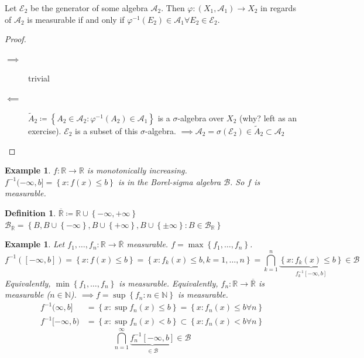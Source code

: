 \documentclass[a4paper]{article}
\newcounter{lecref}[section]
\numberwithin{lecref}{section}
\theoremstyle{break}
\newtheorem{example}[lecref]{Example}
\newtheorem*{Example}{Example}
\newtheorem*{Definition}{Definition}
\newcommand{\Set}[1]{\left\{#1\right\}}
\newcommand{\Max}[1]{\max{\Set{#1}}}
\newcommand{\Min}[1]{\min{\Set{#1}}}
\newcommand{\Sup}[1]{\sup{\Set{#1}}}
\begin{document}
\begin{theorem}
  Let $\mathcal E_2$ be the generator of some algebra $\mathcal A_2$.
  Then $\varphi: (X_1, \mathcal A_1) \to X_2$ in regards of $\mathcal A_2$ is measurable
  if and only if $\varphi^{-1}(E_2) \in \mathcal A_1 \forall E_2 \in \mathcal E_2$.
\end{theorem}
\begin{proof}
  \begin{description}
    \item[$\implies$] trivial
    \item[$\impliedby$]
      $\tilde A_2 \coloneqq \Set{A_2 \in \mathcal A_2: \varphi^{-1}(A_2) \in \mathcal A_1}$
      is a $\sigma$-algebra over $X_2$ (why? left as an exercise).
      $\mathcal E_2$ is a subset of this $\sigma$-algebra.
      $\implies \mathcal A_2 = \sigma(\mathcal E_2) \in \tilde A_2 \subset \mathcal A_2$
  \end{description}
\end{proof}

\begin{Example}
  $f: \mathbb R \to \mathbb R$ is monotonically increasing.
  $f^{-1}(-\infty, b] = \Set{x: f(x) \leq b}$ is in the Borel-sigma algebra $\mathcal B$.
  So $f$ is measurable.
\end{Example}

\begin{Definition}
  $\overline{\mathbb R} \coloneqq \mathbb R \cup \Set{-\infty, +\infty}$ \\
  ${\mathcal B}_{\overline{\mathbb R}} = \Set{B, B \cup \Set{-\infty}, B \cup \Set{+\infty}, B \cup \Set{\pm\infty}: B \in \mathcal B_{\mathbb R}}$
\end{Definition}

\begin{example}
  Let $f_1, \dots, f_n: \mathbb R \to \overline{\mathbb R}$ measurable.
  $f = \Max{f_1, \dots, f_n}$.
  \[ f^{-1}([-\infty, b]) = \Set{x: f(x) \leq b} = \Set{x: f_k(x) \leq b, k = 1, \dots, n} = \bigcap_{k=1}^n \underbrace{\Set{x: f_k(x) \leq b}}_{f_k^{-1}[-\infty, b]} \in \mathcal B \]
  Equivalently, $\Min{f_1, \dots, f_n}$ is measurable.
  Equivalently, $f_n: \mathbb R \to \overline{\mathbb R}$ is measurable ($n \in \mathbb N$).
  $\implies f = \Sup{f_n: n \in \mathbb N}$ is measurable.
  \begin{align*}
    f^{-1}(\infty, b] &= \Set{x: \sup f_n(x) \leq b} = \Set{x: f_n(x) \leq b \forall n} \\
    f^{-1}[-\infty, b) &= \Set{x: \sup{f_n(x)} < b} \subset \Set{x: f_n(x) < b \forall n}
  \end{align*}
  \[ \bigcap_{n=1}^\infty \underbrace{f_n^{-1}[-\infty, b]}_{\in \mathcal B} \in \mathcal B \]
\end{example}
\end{document}
